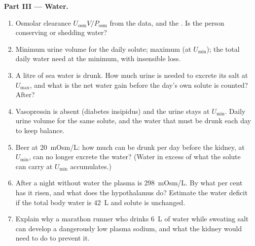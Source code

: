 \begin{problem}
\medskip
\noindent\textbf{Part III --- Water.}
\begin{enumerate}[resume]
  \item Osmolar clearance $U_{\text{osm}}V/P_{\text{osm}}$ from the
        data, and the . Is the person conserving or
        shedding water?
  \item Minimum urine volume for the daily solute; maximum (at
        $U_{\min}$); the total daily water need at the minimum, with
        insensible loss.
  \item A litre of sea water is drunk. How much urine is needed to
        excrete its salt at $U_{\max}$, and what is the net water gain
        before the day's own solute is counted? After?
  \item Vasopressin is absent (diabetes insipidus) and the urine stays
        at $U_{\min}$. Daily urine volume for the same solute, and the
        water that must be drunk each day to keep balance.
  \item Beer at \qty{20}{mOsm/L}: how much can be drunk per day before
        the kidney, at $U_{\min}$, can no longer excrete the water?
        (Water in excess of what the solute can carry at $U_{\min}$
        accumulates.)
  \item After a night without water the plasma  is
        \qty{298}{mOsm/L}. By what per cent has it risen, and what does
        the hypothalamus do? Estimate the water deficit if the total
        body water is \qty{42}{L} and solute is unchanged.
  \item Explain why a marathon runner who drinks \qty{6}{L} of water
        while sweating salt can develop a dangerously low plasma sodium,
        and what the kidney would need to do to prevent it.
\end{enumerate}


\end{problem}
